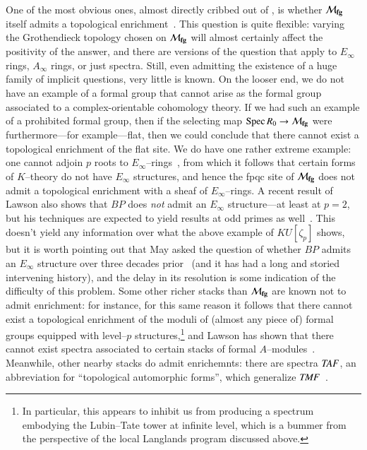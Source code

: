 One of the most obvious ones, almost directly cribbed out of , is whether $\mathcal{M}_{\mathbf{fg}}$ itself admits a topological enrichment~\cite{GoerssRealizingFamilies}.  This question is quite flexible: varying the Grothendieck topology chosen on $\mathcal{M}_{\mathbf{fg}}$ will almost certainly affect the positivity of the answer, and there are versions of the question that apply to $E_\infty$ rings, $A_\infty$ rings, or just spectra.  Still, even admitting the existence of a huge family of implicit questions, very little is known.  On the looser end, we do not have an example of a formal group that cannot arise as the formal group associated to a complex-orientable cohomology theory.  If we had such an example of a prohibited formal group, then if the selecting map $\operatorname{Spec} R_0 \to \mathcal{M}_{\mathbf{fg}}$ were furthermore---for example---flat, then we could conclude that there cannot exist a topological enrichment of the flat site.  We do have one rather extreme example: one cannot adjoin $p${\th} roots to $E_\infty$--rings~\cite{SchwaenzlRolandVogt,Devalapurkar}, from which it follows that certain forms of $K$--theory do not have $E_\infty$ structures, and hence the fpqc site of $\mathcal{M}_{\mathbf{fg}}$ does not admit a topological enrichment with a sheaf of $E_\infty$--rings.  A recent result of Lawson also shows that $BP$ does \emph{not} admit an $E_\infty$ structure---at least at $p = 2$, but his techniques are expected to yield results at odd primes as well~\cite{LawsonSecondaryPowerOps}.  This doesn't yield any information over what the above example of $KU[\zeta_p]$ shows, but it is worth pointing out that May asked the question of whether $BP$ admits an $E_\infty$ structure over three decades prior~\cite{MayProblemsInLoopspaceTheory} (and it has had a long and storied intervening history), and the delay in its resolution is some indication of the difficulty of this problem.  Some other richer stacks than $\mathcal{M}_{\mathbf{fg}}$ are known not to admit enrichment: for instance, for this same reason it follows that there cannot exist a topological enrichment of the moduli of (almost any piece of) formal groups equipped with level--$p$ structures,\footnote{In particular, this appears to inhibit us from producing a spectrum embodying the Lubin--Tate tower at infinite level, which is a bummer from the perspective of the local Langlands program discussed above.} and Lawson has shown that there cannot exist spectra associated to certain stacks of formal $A$--modules~\cite{LawsonRealizability}.  Meanwhile, other nearby stacks do admit enrichemnts: there are spectra $\mathit{TAF}$, an abbreviation for ``topological automorphic forms'', which generalize $\mathit{TMF}$~\cite{BehrensLawson}.


